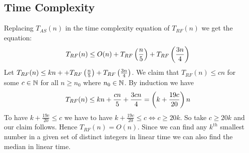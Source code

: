 \subsection{Time Complexity}
Replacing $T_{AS}(n)$ in the time complexity equation of $T_{RF}(n)$ we get the equation:$$T_{RF}(n)\leq O(n)+T_{RF}\left(\frac{n}5\right)+T_{RF}\left(\frac{3n}{4}\right)$$Let $T_{RF}(n)\leq kn++T_{RF}\left(\frac{n}5\right)+T_{RF}\left(\frac{3n}{4}\right)$. We claim that $T_{RF}(n)\leq cn$ for some $c\in \mathbb{N}$ for all $n\geq n_0$ where $n_0\in \mathbb{N}$. By induction we have $$T_{RF}(n)\leq kn+\frac{cn}{5}+\frac{3cn}{4}=\left(k+\frac{19c}{20}\right)n$$To have  $k+\frac{19c}{20}\leq c$ we have to have $k+\frac{19c}{20}\leq c\iff c\geq 20k$. So take $c\geq 20k$ and our claim follows. Hence $T_{RF}(n)=O(n)$. Since we can find any $k^{th}$ smallest number in a given set of distinct integers in linear time we can also find the median in linear time.